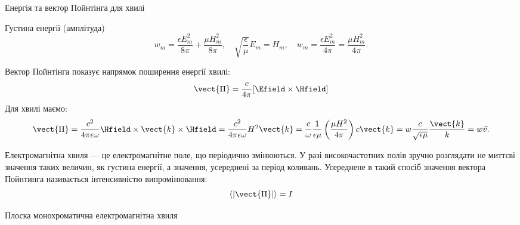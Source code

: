 \documentclass[onlytextwidth]{beamer}
\begin{document}
\begin{frame}{Енергія та вектор Пойнтінга для хвилі}{}
	\begin{block}{}\justifying

		Густина енергії (амплітуда)
		\begin{equation*}
			w_m = \frac{\epsilon E_m^2}{8\pi} + \frac{\mu H_m^2}{8\pi}, \quad  \sqrt{\frac{\epsilon}{\mu}} E_m = H_m, \quad w_m = \frac{\epsilon
				E_m^2}{4\pi} = \frac{\mu H_m^2}{4\pi}.
		\end{equation*}
	\end{block}
	\begin{block}{}\justifying
		Вектор Пойнтінга показує напрямок поширення енергії хвилі:
		\begin{equation*}
			\vect{\Pi} = \frac{c}{4\pi}[\Efield\times\Hfield]
		\end{equation*}
		Для хвилі маємо:
		\begin{equation*}
			\vect{\Pi} =  \frac{c^2}{4\pi\epsilon \omega} \Hfield\times\vect{k}\times\Hfield = \frac{c^2}{4\pi\epsilon \omega} H^2 \vect{k} =
			\frac{c}{\omega} \frac{1}{\epsilon\mu}\left( \frac{\mu H^2}{4\pi}\right)   c \vect{k} = w \frac{c}{\sqrt{\epsilon\mu}}
			\frac{\vect{k}}{k}= w
			\vec{v}.
		\end{equation*}
	\end{block}
	\begin{block}{}\justifying\small
		Електромагнітна хвиля --- це електромагнітне поле, що періодично змінюються. У разі високочастотних полів зручно розглядати не миттєві значення
		таких величин, як густина енергії, а значення, усереднені за період коливань. Усереднене в такий спосіб значення вектора Пойнтинга називається
		\alert{інтенсивністю випромінювання}:
		\begin{equation*}
			\left\langle |\vect{\Pi}| \right\rangle = I
		\end{equation*}
	\end{block}
\end{frame}



\begin{frame}{Плоска монохроматична електромагнітна хвиля}{}
	\begin{center}
		
	\end{center}
\end{frame}
\end{document}
